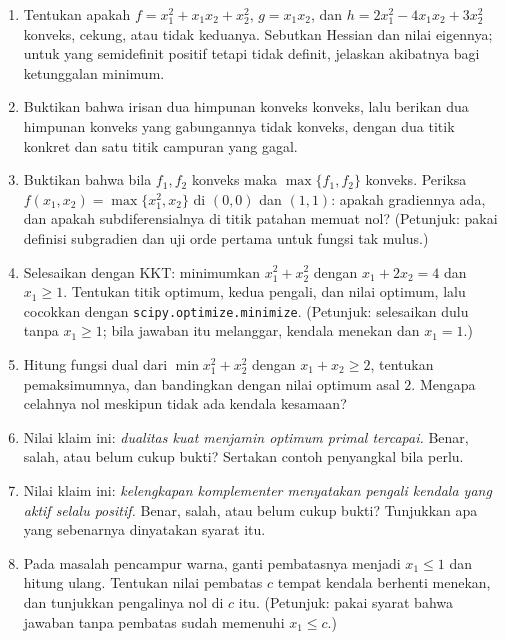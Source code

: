 \begin{latihan}
\begin{enumerate}
  \item Tentukan apakah $f=x_{1}^{2}+x_{1}x_{2}+x_{2}^{2}$, $g=x_{1}x_{2}$, dan
        $h=2x_{1}^{2}-4x_{1}x_{2}+3x_{2}^{2}$ konveks, cekung, atau tidak keduanya.
        Sebutkan Hessian dan nilai eigennya; untuk yang semidefinit positif tetapi tidak
        definit, jelaskan akibatnya bagi ketunggalan minimum.

  \item Buktikan bahwa irisan dua himpunan konveks konveks, lalu berikan dua himpunan
        konveks yang gabungannya tidak konveks, dengan dua titik konkret dan satu titik
        campuran yang gagal.

  \item Buktikan bahwa bila $f_{1},f_{2}$ konveks maka $\max\{f_{1},f_{2}\}$ konveks.
        Periksa $f(x_{1},x_{2})=\max\{x_{1}^{2},x_{2}\}$ di $(0,0)$ dan $(1,1)$: apakah
        gradiennya ada, dan apakah subdiferensialnya di titik patahan memuat nol?
        (Petunjuk: pakai definisi subgradien dan uji orde pertama untuk fungsi tak mulus.)

  \item Selesaikan dengan KKT: minimumkan $x_{1}^{2}+x_{2}^{2}$ dengan $x_{1}+2x_{2}=4$
        dan $x_{1}\ge1$. Tentukan titik optimum, kedua pengali, dan nilai optimum, lalu
        cocokkan dengan \texttt{scipy.optimize.minimize}. (Petunjuk: selesaikan dulu tanpa
        $x_{1}\ge1$; bila jawaban itu melanggar, kendala menekan dan $x_{1}=1$.)

  \item Hitung fungsi dual dari $\min x_{1}^{2}+x_{2}^{2}$ dengan $x_{1}+x_{2}\ge2$,
        tentukan pemaksimumnya, dan bandingkan dengan nilai optimum asal $2$. Mengapa
        celahnya nol meskipun tidak ada kendala kesamaan?

  \item Nilai klaim ini: \emph{dualitas kuat menjamin optimum primal tercapai.} Benar,
        salah, atau belum cukup bukti? Sertakan contoh penyangkal bila perlu.

  \item Nilai klaim ini: \emph{kelengkapan komplementer menyatakan pengali kendala yang
        aktif selalu positif.} Benar, salah, atau belum cukup bukti? Tunjukkan apa yang
        sebenarnya dinyatakan syarat itu.

  \item Pada masalah pencampur warna, ganti pembatasnya menjadi $x_{1}\le1$ dan hitung
        ulang. Tentukan nilai pembatas $c$ tempat kendala berhenti menekan, dan tunjukkan
        pengalinya nol di $c$ itu. (Petunjuk: pakai syarat bahwa jawaban tanpa pembatas
        sudah memenuhi $x_{1}\le c$.)


\end{enumerate}
\end{latihan}
